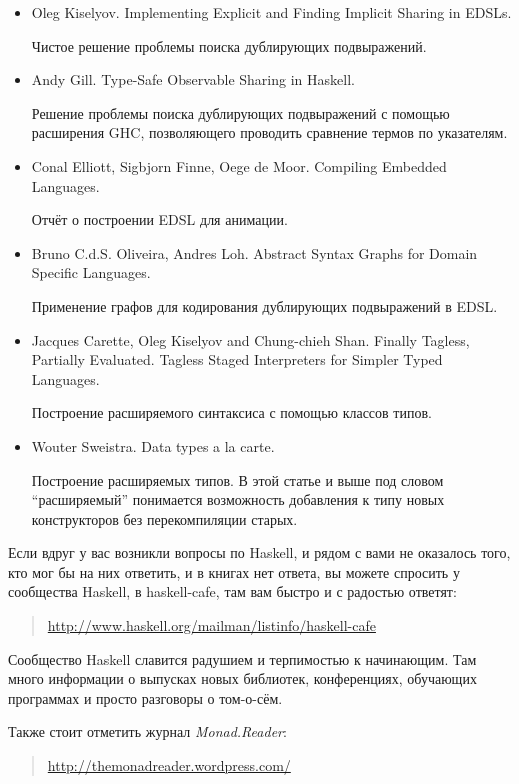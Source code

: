\begin{itemize}
\item
  Oleg Kiselyov. Implementing Explicit and Finding Implicit Sharing in
  EDSLs.

  Чистое решение проблемы поиска дублирующих подвыражений.
\item
  Andy Gill. Type-Safe Observable Sharing in Haskell.

  Решение проблемы поиска дублирующих подвыражений с помощью расширения
  GHC, позволяющего проводить сравнение термов по указателям.
\item
  Conal Elliott, Sigbjorn Finne, Oege de Moor. Compiling Embedded
  Languages.

  Отчёт о построении EDSL для анимации.
\item
  Bruno C.d.S. Oliveira, Andres Loh. Abstract Syntax Graphs for Domain
  Specific Languages.

  Применение графов для кодирования дублирующих подвыражений в EDSL.
\item
  Jacques Carette, Oleg Kiselyov and Chung-chieh Shan. Finally Tagless,
  Partially Evaluated. Tagless Staged Interpreters for Simpler Typed
  Languages.

  Построение расширяемого синтаксиса с помощью классов типов.
\item
  Wouter Sweistra. Data types a la carte.

  Построение расширяемых типов. В этой статье и выше под словом
  ``расширяемый'' понимается возможность добавления к типу новых
  конструкторов без перекомпиляции старых.
\end{itemize}


Если вдруг у вас возникли вопросы по Haskell, и рядом с вами не
оказалось того, кто мог бы на них ответить, и в книгах нет ответа, вы
можете спросить у сообщества Haskell, в haskell-cafe, там вам быстро и с
радостью ответят:

\begin{quote}
\url{http://www.haskell.org/mailman/listinfo/haskell-cafe}
\end{quote}

Сообщество Haskell славится радушием и терпимостью к начинающим. Там
много информации о выпусках новых библиотек, конференциях, обучающих
программах и просто разговоры о том-о-сём.

Также стоит отметить журнал \emph{Monad.Reader}:

\begin{quote}
\url{http://themonadreader.wordpress.com/}
\end{quote}

